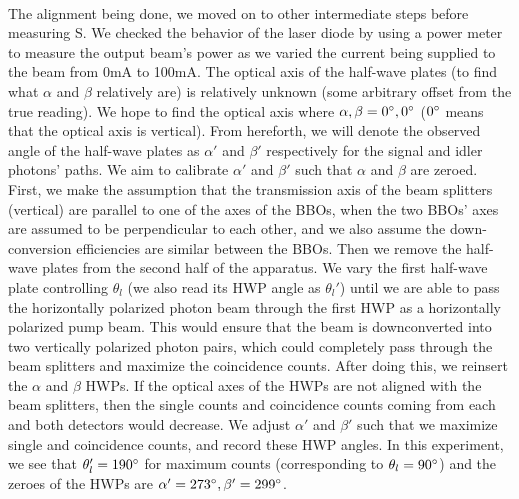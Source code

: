 \documentclass{article}
\begin{document}
    \\\indent The alignment being done, we moved on to other intermediate steps before measuring S. We checked the behavior of the laser diode by using a power meter to measure the output beam's power as we varied the current being supplied to the beam from 0mA to 100mA. The optical axis of the half-wave plates (to find what $\alpha$ and $\beta$ relatively are) is relatively unknown (some arbitrary offset from the true reading). We hope to find the optical axis where $\alpha,\beta=0\degree,0\degree$ ($0\degree$ means that the optical axis is vertical). From hereforth, we will denote the observed angle of the half-wave plates as $\alpha'$ and $\beta'$ respectively for the signal and idler photons' paths. We aim to calibrate $\alpha'$ and $\beta'$ such that $\alpha$ and $\beta$ are zeroed. First, we make the assumption that the transmission axis of the beam splitters (vertical) are parallel to one of the axes of the BBOs, when the two BBOs' axes are assumed to be perpendicular to each other, and we also assume the down-conversion efficiencies are similar between the BBOs. Then we remove the half-wave plates from the second half of the apparatus. We vary the first half-wave plate controlling $\theta_l$ (we also read its HWP angle as $\theta_l'$) until we are able to pass the horizontally polarized photon beam through the first HWP as a horizontally polarized pump beam. This would ensure that the beam is downconverted into two vertically polarized photon pairs, which could completely pass through the beam splitters and maximize the coincidence counts. After doing this, we reinsert the $\alpha$ and $\beta$ HWPs. If the optical axes of the HWPs are not aligned with the beam splitters, then the single counts and coincidence counts coming from each and both detectors would decrease. We adjust $\alpha'$ and $\beta'$ such that we maximize single and coincidence counts, and record these HWP angles. In this experiment, we see that $\theta_l' = 190\degree$ for maximum counts (corresponding to $\theta_l = 90\degree$) and the zeroes of the HWPs are $\alpha' = 273\degree, \beta' = 299\degree$.
\end{document}
